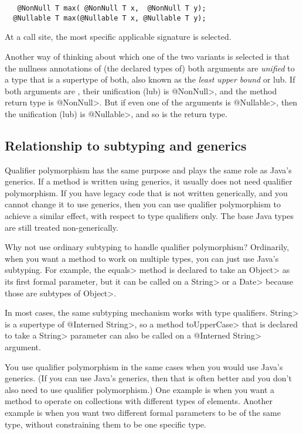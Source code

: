 \begin{Verbatim}
   @NonNull T max( @NonNull T x,  @NonNull T y);
  @Nullable T max(@Nullable T x, @Nullable T y);
\end{Verbatim}

\noindent
At a call site, the most specific applicable signature is selected.

Another way of thinking about which one of the two  variants is
selected is that the nullness annotations of (the declared types of) both
arguments are \emph{unified} to a type that is a supertype of both, also
known as the \emph{least upper bound} or lub.  If both
arguments are , their unification (lub) is \<@NonNull>, and the
method return type is \<@NonNull>.  But if even one of the arguments is \<@Nullable>,
then the unification (lub) is \<@Nullable>, and so is the return type.



\subsection{Relationship to subtyping and generics\label{qualifier-polymorhism-vs-subtyping}}

Qualifier polymorphism has the same purpose and plays the same role as
Java's generics.  If a method is written using generics, it usually does
not need qualifier polymorphism.  If you have legacy code that is not
written generically, and you cannot change it to use generics, then you can
use qualifier polymorphism to achieve a similar effect, with respect to
type qualifiers only.  The base Java types are still treated non-generically.

Why not use ordinary subtyping to handle qualifier polymorphism?
Ordinarily, when you want a method to work on multiple types, you can just
use Java's subtyping.  For example, the \<equals> method is declared to
take an \<Object> as its first formal parameter, but it can be called on a
\<String> or a \<Date> because those are subtypes of \<Object>.

In most cases, the same subtyping mechanism works with type qualifiers.
\<String> is a supertype of \<@Interned String>, so a method \<toUpperCase>
that is declared to take a \<String> parameter can also be called on a
\<@Interned String> argument.

You use qualifier polymorphism in the same cases when you would use Java's
generics.  (If you can use Java's generics, then that is often better and
you don't also need to use qualifier polymorphism.)  One example is when
you want a method to operate on collections with different types of
elements.  Another example is when you want two different formal parameters
to be of the same type, without constraining them to be one specific type.



